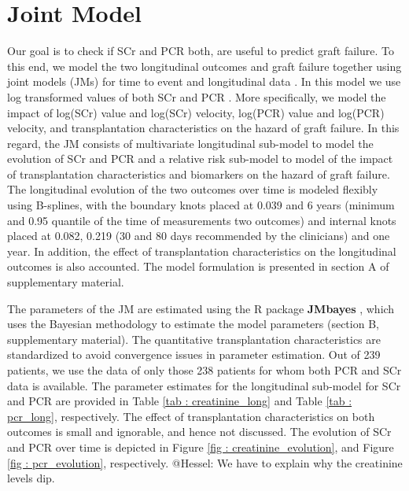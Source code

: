 
\section{Joint Model}
\label{sec : joint_model}
Our goal is to check if SCr and PCR both, are useful to predict graft failure. To this end, we model the two longitudinal outcomes and graft failure together using joint models (JMs) for time to event and longitudinal data \citep{tsiatis2004joint,rizopoulos2012joint}. In this model we use log transformed values of both SCr and PCR \citep{fournier2016joint}. More specifically, we model the impact of log(SCr) value and log(SCr) velocity, log(PCR) value and log(PCR) velocity, and transplantation characteristics on the hazard of graft failure. In this regard, the JM consists of multivariate longitudinal sub-model to model the evolution of SCr and PCR and a relative risk sub-model to model of the impact of transplantation characteristics and biomarkers on the hazard of graft failure. The longitudinal evolution of the two outcomes over time is modeled flexibly using B-splines, with the boundary knots placed at 0.039 and 6 years (minimum and 0.95 quantile of the time of measurements two outcomes) and internal knots placed at 0.082, 0.219 (30 and 80 days recommended by the clinicians) and one year. In addition, the effect of transplantation characteristics on the longitudinal outcomes is also accounted. The model formulation is presented in section A of supplementary material.

The parameters of the JM are estimated using the R package \textbf{JMbayes} \citep{rizopoulosJMbayes}, which uses the Bayesian methodology to estimate the model parameters (section B, supplementary material). The quantitative transplantation characteristics are standardized to avoid convergence issues in parameter estimation. Out of 239 patients, we use the data of only those 238 patients for whom both PCR and SCr data is available. The parameter estimates for the longitudinal sub-model for SCr and PCR are provided in Table \ref{tab : creatinine_long} and Table \ref{tab : pcr_long}, respectively. The effect of transplantation characteristics on both outcomes is small and ignorable, and hence not discussed. The evolution of SCr and PCR over time is depicted in Figure \ref{fig : creatinine_evolution}, and Figure \ref{fig : pcr_evolution}, respectively.
@Hessel: We have to explain why the creatinine levels dip. 

